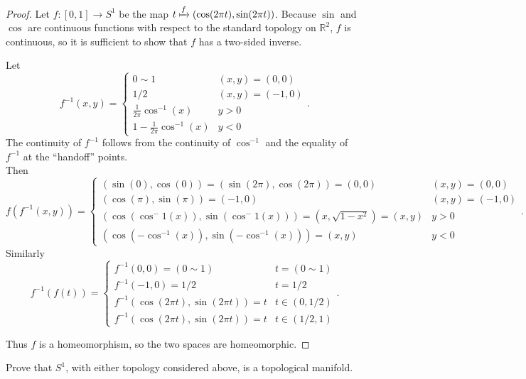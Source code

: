 \documentclass{article}
\newenvironment{problem}[2][Problem]{\begin{trivlist}
\item[\hskip \labelsep {\bfseries #1}\hskip \labelsep {\bfseries #2.}]}{\end{trivlist}}
\begin{document}
\begin{proof}
  Let $f: [0, 1] \rightarrow S^1$ be the map $t \xmapsto{f} (\cos(2\pi t), \sin(2\pi t))$.
  Because $\sin$ and $\cos$ are continuous functions
  with respect to the standard topology on $\mathbb{R}^2$,
  $f$ is continuous, so it is sufficient to show that $f$
  has a two-sided inverse.

  Let \[
    f^{-1}(x, y) = \begin{cases}
      0 \sim 1 & (x, y) = (0, 0) \\
      1/2 & (x, y) = (-1, 0) \\
      \frac{1}{2\pi}\cos^{-1}(x) & y > 0 \\
      1 - \frac{1}{2\pi}\cos^{-1}(x) & y < 0
    \end{cases}.
  \] The continuity of $f^{-1}$ follows from the continuity of $\cos^{-1}$
  and the equality of $f^{-1}$ at the ``handoff'' points.\\
  Then \[
    f(f^{-1}(x, y)) = \begin{cases}
      (\sin(0), \cos(0)) = (\sin(2\pi), \cos(2\pi)) = (0, 0) & (x, y) = (0, 0) \\
      (\cos(\pi), \sin(\pi)) = (-1, 0) & (x, y) = (-1, 0) \\
      (\cos(\cos^-1(x)), \sin(\cos^-1(x))) = (x, \sqrt{1 - x^2}) = (x, y) & y > 0 \\
      (\cos(-\cos^{-1}(x)), \sin(-\cos^{-1}(x))) = (x, y) & y < 0
    \end{cases}.
  \] Similarly \[
    f^{-1}(f(t)) = \begin{cases}
      f^{-1}(0, 0) = (0 \sim 1)              & t =  (0 \sim 1) \\
      f^{-1}(-1, 0) = 1/2                    & t =  1/2 \\
      f^{-1}(\cos(2\pi t), \sin(2\pi t)) = t & t\in (0, 1/2) \\
      f^{-1}(\cos(2\pi t), \sin(2\pi t)) = t & t\in (1/2, 1)
    \end{cases}.
  \]

  Thus $f$ is a homeomorphism, so
   the two spaces are homeomorphic.
\end{proof}

\pagebreak

\begin{problem}{3}
  Prove that $S^1$, with either topology considered above, is a topological
  manifold.
\end{problem}
\end{document}

